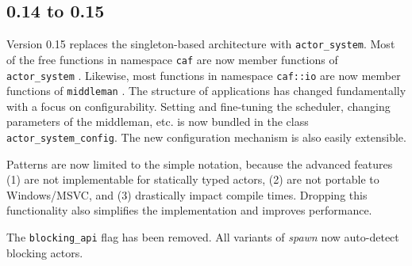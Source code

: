 \clearpage
\subsection{0.14 to 0.15}

Version 0.15 replaces the singleton-based architecture with
\lstinline^actor_system^. Most of the free functions in namespace
\lstinline^caf^ are now member functions of \lstinline^actor_system^
. Likewise, most functions in namespace \lstinline^caf::io^
are now member functions of \lstinline^middleman^ . The
structure of \lib applications has changed fundamentally with a focus on
configurability. Setting and fine-tuning the scheduler, changing parameters of
the middleman, etc. is now bundled in the class
\lstinline^actor_system_config^. The new configuration mechanism is also easily
extensible.

Patterns are now limited to the simple notation, because the advanced features
(1) are not implementable for statically typed actors, (2) are not portable to
Windows/MSVC, and (3) drastically impact compile times. Dropping this
functionality also simplifies the implementation and improves performance.

The \lstinline^blocking_api^ flag has been removed. All variants of
\emph{spawn} now auto-detect blocking actors.
